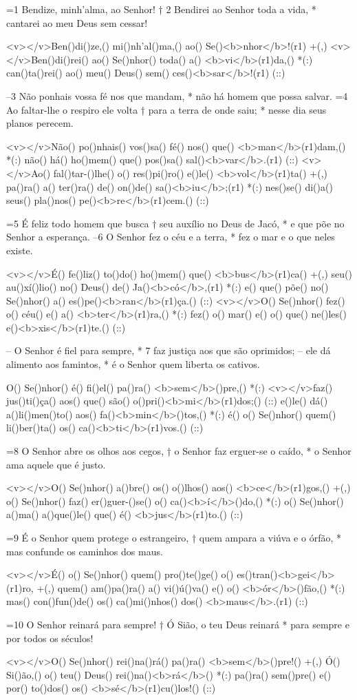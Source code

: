 =1 Bendize, minh'alma, ao Senhor! †
 2 Bendirei ao Senhor toda a vida, * 
cantarei ao meu Deus sem cessar!  

<v></v>Ben()di()ze,() mi()nh'al()ma,() ao() Se()<b>nhor</b>!(r1) +(,)
<v></v>Ben()di()rei() ao() Se()nhor() toda() a() <b>vi</b>(r1)da,() *(:)
can()ta()rei() ao() meu() Deus() sem() ces()<b>sar</b>!(r1) (::)

–3 Não ponhais vossa fé nos que mandam, * 
não há homem que possa salvar. 
=4 Ao faltar-lhe o respiro ele volta † 
para a terra de onde saiu; *
nesse dia seus planos perecem.  

<v></v>Não() po()nhais() vos()sa() fé() nos() que() <b>man</b>(r1)dam,() *(:)
não() há() ho()mem() que() pos()sa() sal()<b>var</b>.(r1) (::)
<v></v>Ao() fal()tar-()lhe() o() res()pi()ro() e()le() <b>vol</b>(r1)ta() +(,)
pa()ra() a() ter()ra() de() on()de() sa()<b>iu</b>;(r1) *(:)
nes()se() di()a() seus() pla()nos() pe()<b>re</b>(r1)cem.() (::)

=5 É feliz todo homem que busca † 
seu auxílio no Deus de Jacó, * 
e que põe no Senhor a esperança. 
–6 O Senhor fez o céu e a terra, * 
fez o mar e o que neles existe.  

<v></v>É() fe()liz() to()do() ho()mem() que() <b>bus</b>(r1)ca() +(,)
seu() au()xí()lio() no() Deus() de() Ja()<b>có</b>,(r1) *(:)
e() que() põe() no() Se()nhor() a() es()pe()<b>ran</b>(r1)ça.() (::)
<v></v>O() Se()nhor() fez() o() céu() e() a() <b>ter</b>(r1)ra,() *(:)
fez() o() mar() e() o() que() ne()les() e()<b>xis</b>(r1)te.() (::)

– O Senhor é fiel para sempre, * 
7 faz justiça aos que são oprimidos; 
– ele dá alimento aos famintos, * 
é o Senhor quem liberta os cativos.  

O() Se()nhor() é() fi()el() pa()ra() <b>sem</b>()pre,() *(:)
<v></v>faz() jus()ti()ça() aos() que() são() o()pri()<b>mi</b>(r1)dos;() (::)
e()le() dá() a()li()men()to() aos() fa()<b>min</b>()tos,() *(:)
é() o() Se()nhor() quem() li()ber()ta() os() ca()<b>ti</b>(r1)vos.() (::)

=8 O Senhor abre os olhos aos cegos, †
o Senhor faz erguer-se o caído, * 
o Senhor ama aquele que é justo. 

<v></v>O() Se()nhor() a()bre() os() o()lhos() aos() <b>ce</b>(r1)gos,() +(,)
o() Se()nhor() faz() er()guer-()se() o() ca()<b>í</b>()do,() *(:)
o() Se()nhor() a()ma() a()que()le() que() é() <b>jus</b>(r1)to.() (::)

=9 É o Senhor quem protege o estrangeiro, † 
quem ampara a viúva e o órfão, * 
mas confunde os caminhos dos maus.  

<v></v>É() o() Se()nhor() quem() pro()te()ge() o() es()tran()<b>gei</b>(r1)ro, +(,)
quem() am()pa()ra() a() vi()ú()va() e() o() <b>ór</b>()fão,() *(:)
mas() con()fun()de() os() ca()mi()nhos() dos() <b>maus</b>.(r1) (::)

=10 O Senhor reinará para sempre! †
Ó Sião, o teu Deus reinará *
para sempre e por todos os séculos!

<v></v>O() Se()nhor() rei()na()rá() pa()ra() <b>sem</b>()pre!() +(,)
Ó() Si()ão,() o() teu() Deus() rei()na()<b>rá</b>() *(:)
pa()ra() sem()pre() e() por() to()dos() os() <b>sé</b>(r1)cu()los!() (::)